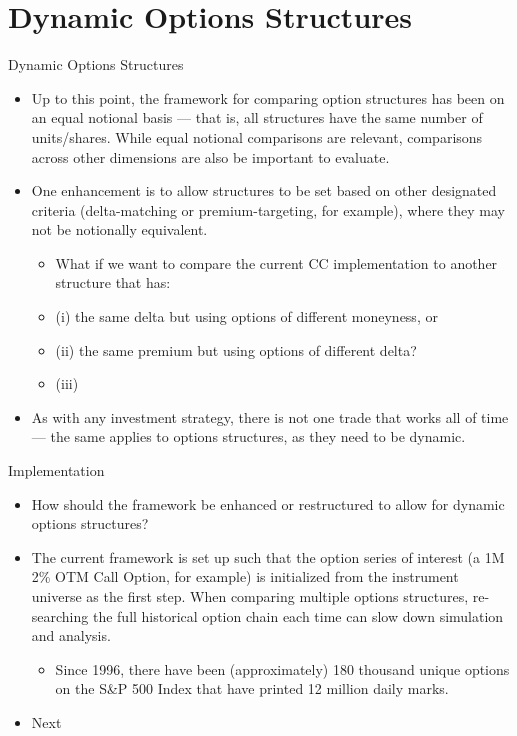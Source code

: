 \documentclass{beamer}
\begin{document}
\section{Dynamic Options Structures}
\begin{frame}{Dynamic Options Structures}
\begin{itemize}
\item Up to this point, the framework for comparing option structures has been on an equal notional basis --- that is, all structures have the same number of units/shares. While equal notional comparisons are relevant, comparisons across other dimensions are also be important to evaluate.
\item[] One enhancement is to allow structures to be set based on other designated criteria (delta-matching or premium-targeting, for example), where they may not be notionally equivalent. 
\begin{itemize}
\item What if we want to compare the current CC implementation to another structure that has:
\item[] (i) the same delta but using options of different moneyness, or 
\item[] (ii) the same premium but using options of different delta?
\item[] (iii) 
\end{itemize}
\item As with any investment strategy, there is not one trade that works all of time --- the same applies to options structures, as they need to be dynamic. 
\end{itemize}
\end{frame}

\begin{frame}{Implementation}
\begin{itemize}
\item How should the framework be enhanced or restructured to allow for dynamic options structures?
\item The current framework is set up such that the option series of interest (a 1M 2\% OTM Call Option, for example) is initialized from the instrument universe as the first step. When comparing multiple options structures, re-searching the full historical option chain each time can slow down simulation and analysis.
\begin{itemize}
\item Since 1996, there have been (approximately) 180 thousand unique options on the S\&P 500 Index that have printed 12 million daily marks. 
\end{itemize}
\item Next
\end{itemize}
\end{frame}
\end{document}
